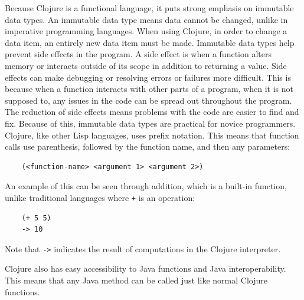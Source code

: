 \documentclass[12pt]{article}
\newcommand{\comment}[1]{{\bf \tt  {#1}}}
\newcommand{\emcomment}[1]{\textcolor{ForestGreen}{\comment{Elena: {#1}}}}
\newcommand{\hfcomment}[1]{\textcolor{Teal}{\comment{Henry: {#1}}}}
\begin{document}
Because Clojure is a functional language, it puts strong emphasis on
immutable data types. An immutable data type means data cannot 
be changed, unlike in %
imperative programming languages. When using Clojure, in order to change a data item, an entirely 
new data item must be made. Immutable data types help prevent side effects in the program. 
A side effect is when a function alters memory or interacts outside of its scope in addition to 
returning a value. Side effects can make debugging or resolving errors or failures more
difficult. This is because when a function interacts with other parts of a program,
when it is not supposed to, any issues in the code can be spread out throughout the program. The
reduction of side effects means problems with the code are easier to find and fix.
Because of this, immutable data types are practical for novice programmers.
Clojure, like other Lisp languages, uses prefix notation. This means
that function calls use parenthesis, followed by the function name,
and then any parameters: 
\begin{verbatim}
	(<function-name> <argument 1> <argument 2>)
\end{verbatim}

An example of this can be seen through addition, which is a built-in function, unlike traditional
languages where \texttt{+} is an operation: %

\begin{verbatim}
	(+ 5 5)
	-> 10
\end{verbatim}

Note that \texttt{->} indicates the result of computations in the Clojure interpreter.

Clojure also has easy accessibility to Java functions and Java
interoperability. This means that any Java method can be called just
like normal Clojure functions.
\end{document}
